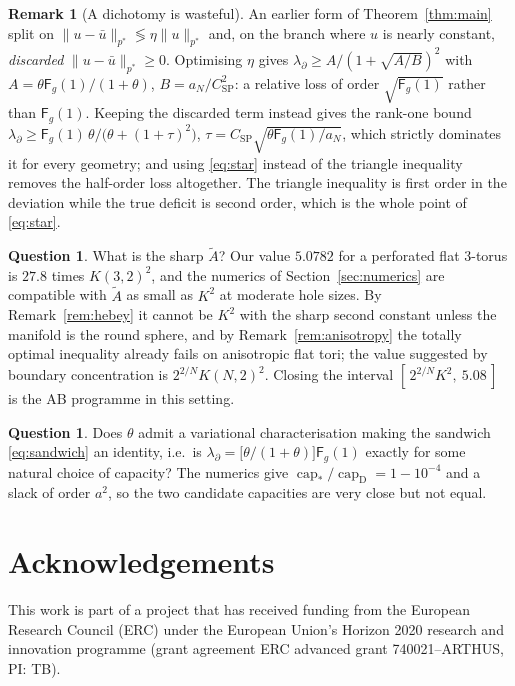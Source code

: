 \documentclass[11pt,reqno]{amsart}
\theoremstyle{plain}
\theoremstyle{definition}
\newtheorem{remark}[theorem]{Remark}
\newtheorem{question}[theorem]{Question}
\newcommand{\aN}{a_N}
\newcommand{\pstar}{p^{*}}
\newcommand{\cpstar}{\operatorname{cap}_{*}}
\newcommand{\Fq}{\mathsf{F}}
\newcommand{\Ksob}{K}
\newcommand{\Csp}{C_{\mathrm{SP}}}
\newcommand{\Atil}{\widetilde{A}}
\begin{document}
\begin{remark}[A dichotomy is wasteful]
\label{rem:dichotomy}
An earlier form of Theorem~\ref{thm:main} split on
$\|u-\bar u\|_{\pstar}\lessgtr\eta\|u\|_{\pstar}$ and, on the branch where $u$ is
nearly constant, \emph{discarded} $\|u-\bar u\|_{\pstar}\ge0$. Optimising $\eta$
gives $\lambda_\partial\ge A/(1+\sqrt{A/B})^2$ with
$A=\theta\Fq_g(1)/(1+\theta)$, $B=\aN/\Csp^2$: a relative loss of order
$\sqrt{\Fq_g(1)}$ rather than $\Fq_g(1)$. Keeping the discarded term instead gives
the rank-one bound
$\lambda_\partial\ge\Fq_g(1)\,\theta/\bigl(\theta+(1+\tau)^2\bigr)$,
$\tau=\Csp\sqrt{\theta\Fq_g(1)/\aN}$, which strictly dominates it for every
geometry; and using \eqref{eq:star} instead of the triangle inequality removes the
half-order loss altogether. The triangle inequality is first order in the
deviation while the true deficit is second order, which is the whole point of
\eqref{eq:star}.
\end{remark}

\begin{question}\label{q:what_sharp_our_value}
What is the sharp $\Atil$? Our value $5.0782$ for a perforated flat $3$-torus is
$27.8$ times $\Ksob(3,2)^2$, and the numerics of Section~\ref{sec:numerics} are
compatible with $\Atil$ as small as $\Ksob^2$ at moderate hole sizes. By
Remark~\ref{rem:hebey} it cannot be $\Ksob^2$ with the sharp second constant unless
the manifold is the round sphere, and by Remark~\ref{rem:anisotropy} the totally
optimal inequality already fails on anisotropic flat tori; the value suggested by
boundary concentration is $2^{2/N}\Ksob(N,2)^2$. Closing the interval
$[\,2^{2/N}\Ksob^2,\ 5.08\,]$ is the AB programme in this setting.
\end{question}

\begin{question}\label{q:does_admit_variational_characterisation}
Does $\theta$ admit a variational characterisation making the sandwich
\eqref{eq:sandwich} an identity, i.e.\ is
$\lambda_\partial=\bigl[\theta/(1+\theta)\bigr]\Fq_g(1)$ exactly for some natural
choice of capacity? The numerics give $\cpstar/\operatorname{cap}_{\mathrm D}
=1-10^{-4}$ and a slack of order $a^2$, so the two candidate capacities are very
close but not equal.
\end{question}

\section*{Acknowledgements}
This work is part of a project that has received funding from the European
Research Council (ERC) under the European Union's Horizon 2020 research and
innovation programme (grant agreement ERC advanced grant 740021--ARTHUS, PI: TB).
\end{document}
